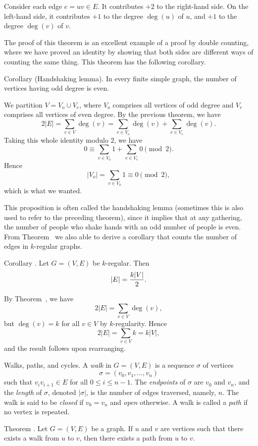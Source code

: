 \proof Consider each edge $e = uv \in E$. It contributes $+2$ to the right-hand side.
On the left-hand side, it contributes $+1$ to the degree $\deg(u)$ of $u$,
and $+1$ to the degree $\deg(v)$ of $v$.\slug

The proof of this theorem is an excellent example of a proof by double counting, where
we have proved an identity by showing that both sides are different ways
of counting the same thing. This theorem has the following corollary.

\parenproclaim Corollary {\advthm} (Handshaking lemma).
In every finite simple graph, the number of vertices having odd degree is even.

\proof We partition $V = V_o \cup V_e$, where $V_o$ comprises all vertices of
odd degree and $V_e$ comprises all vertices of even degree. By the previous theorem,
we have
$$2|E| = \sum_{v\in V} \deg (v) = \sum_{v\in V_o} \deg(v) + \sum_{v\in V_e} \deg(v).$$
Taking this whole identity modulo $2$, we have
$$0 \equiv \sum_{v\in V_o} 1 + \sum_{v\in V_e} 0\pmod 2.$$
Hence
$$|V_o| = \sum_{v\in V_o} 1 \equiv 0\pmod 2,$$
which is what we wanted.\slug

This proposition is often called the handshaking lemma (sometimes this is also used
to refer to the preceding theorem),
since it implies that at any gathering, the number of people who shake hands with
an odd number of people is even. From Theorem~{\thmdegformula} we also able to derive
a corollary that counts the number of edges in $k$-regular graphs.

\proclaim Corollary \advthm. Let $G = (V,E)$ be $k$-regular. Then
$$|E| = {k|V|\over 2}.$$

\proof By Theorem~{\thmdegformula}, we have
$$2|E| = \sum_{v\in V}\deg (v),$$
but $\deg(v) = k$ for all $v\in V$ by $k$-regularity. Hence
$$2|E| = \sum_{v\in V} k = k|V|,$$
and the result follows upon rearranging.\slug

\medskip\boldlabel{} Walks, paths, and cycles.
A {\it walk} in $G = (V,E)$ is a sequence $\sigma$ of vertices
$$\sigma = (v_0, v_1, \ldots, v_n)$$
such that $v_i v_{i+1}\in E$ for all $0\le i \le n-1$. The {\it endpoints}
of $\sigma$ are $v_0$ and $v_n$, and the {\it length} of $\sigma$, denoted $|\sigma|$,
is the number of edges traversed, namely, $n$.
The walk is said to be {\it closed} if $v_0 = v_n$ and {\it open} otherwise.
A walk is called a {\it path} if no vertex is repeated.

\proclaim Theorem \advthm. Let $G = (V,E)$ be a graph. If $u$ and $v$ are vertices
such that there exists a walk from $u$ to $v$, then there exists a path from $u$ to $v$.

